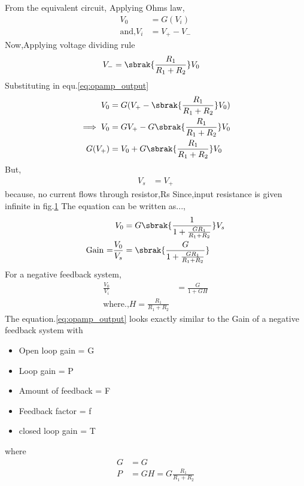 \begin{enumerate}[label=\thesubsection.\arabic*.,ref=\thesubsection.\theenumi]
\begin{figure}[!ht]
\begin{center}
		\resizebox{\columnwidth}{!}{}
	\end{center}
\caption{}
\label{fig:equivalent_circuit}
\end{figure}
From the equivalent circuit,
Applying Ohms law,
\begin{align}
V_0 &= G(V_i) \label{eq:opamp_output}\\
\text{and,} V_i &= V_+-V_-
\end{align}
Now,Applying voltage dividing rule
\begin{align}
V_- &= \sbrak{\frac{R_1}{R_1+R_2}}V_0
\end{align}
Substituting in equ.\ref{eq:opamp_output}
\begin{align}
    V_0 &= G(V_+-\sbrak{\frac{R_1}{R_1+R_2}}V_0)
    \\
\implies V_0 &= GV_+-G\sbrak{\frac{R_1}{R_1+R_2}}V_0
    \\
G(V_+)&=V_0+G\sbrak{\frac{R_1}{R_1+R_2}}V_0
\end{align}
But,
\begin{align}
    V_s &= V_+
\end{align}
because, no current flows through resistor,Rs Since,input resistance is given infinite in fig.\ref{fig:equivalent_circuit} 
The equation can be written as...,
\begin{align}
    V_0 &= G\sbrak{\frac{1}{1+\frac{GR_1}{R_1+R_2}}}V_s
    \\
 \text{Gain =}\frac{V_0}{V_s}&=\sbrak{\frac{G}{1+\frac{GR_1}{R_1+R_2}}}\label{eq:opamp_gain}
\end{align}
For a negative feedback system,
\begin{align}
   \frac{V_0}{V_i} &= \frac{G}{1+GH}
  \\
  \text{where.,} H = \frac{R_1}{R_1+R_2}
\end{align}
The equation.\ref{eq:opamp_output} looks exactly similar to the Gain of a negative feedback system with
\begin{itemize}
    \item Open loop gain = G
    \item Loop gain = P 
    \item Amount of feedback = F
    \item Feedback factor = f
    \item closed loop gain = T
\end{itemize}
where
\begin{align}
    G &= G\\
    P &= GH = G\frac{R_1}{R_1+R_2}\\

\end{align}
\end{enumerate}
